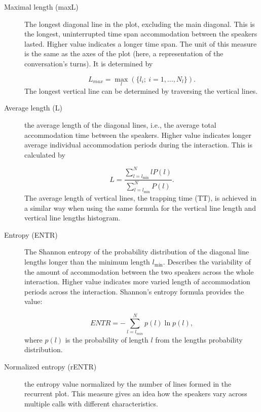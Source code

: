 \begin{description}
	\item[Maximal length (maxL)] The longest diagonal line in the plot, excluding the main diagonal.	
	This is the longest, uninterrupted time span accommodation between the speakers lasted.
	Higher value indicates a longer time span.
	The unit of this measure is the same as the axes of the plot (here, a representation of the conversation's turns).
	It is determined by
	
	\begin{equation}
	\label{eq:maxl}
	L_{max} = \max_{l} (\{l_i; \ i=1, \ldots, N_l\}).
	\end{equation}
	The longest vertical line can be determined by traversing the vertical lines.
	
	\item[Average length (L)] the average length of the diagonal lines, i.e., the average total accommodation time between the speakers.
	Higher value indicates longer average individual accommodation periods during the interaction.
	This is calculated by
	
	\begin{equation}
	\label{eq:l}
	L = \frac{\sum_{l=l_{\min}}^N l P(l)}{\sum_{l=l_{\min}}^N P(l)}.
	\end{equation}
	The average length of vertical lines, the trapping time (TT), is achieved in a similar way when using the same formula for the vertical line length and vertical line lengths histogram.
	
	
	\item[Entropy (ENTR)]The Shannon entropy of the probability distribution of the diagonal line lengths longer than the minimum length $l_{\min}$.
	Describes the variability of the amount of accommodation between the two speakers across the whole interaction.
	Higher value indicates more varied length of accommodation periods across the interaction.
	Shannon's entropy formula provides the value:
	
	\begin{equation}
	\label{eq:entr}
	ENTR = -\sum_{l=l_{min}}^{N} p(l) \ln p(l),
	\end{equation}
	where $p(l)$ is the probability of length $l$ from the lengths probability distribution.
	\item[Normalized entropy (rENTR)] the entropy value normalized by the number of lines formed in the recurrent plot.
	This measure gives an idea how the speakers vary across multiple calls with different characteristics.
	
\end{description}

